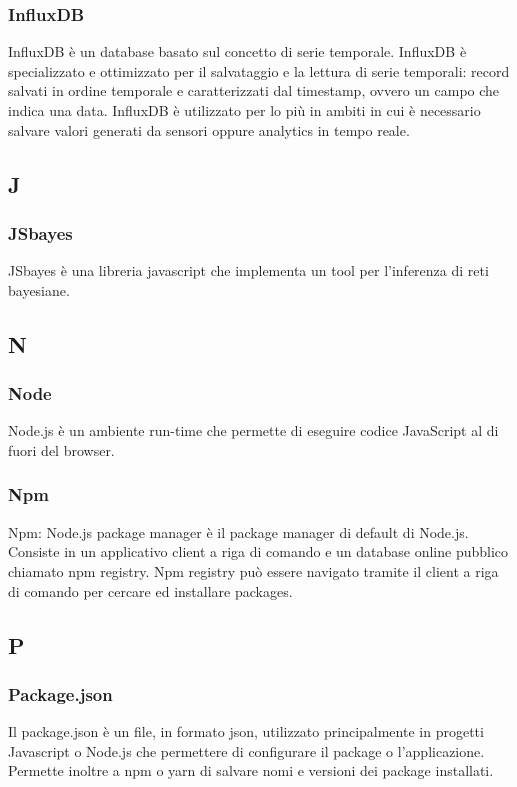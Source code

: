 	\subsubsection*{InfluxDB} 
	\label{sec:influxdb}
InfluxDB è un database basato sul concetto di serie temporale. InfluxDB è specializzato e ottimizzato per il salvataggio e la lettura di serie temporali: record salvati in ordine temporale e caratterizzati dal timestamp, ovvero un campo che indica una data. InfluxDB è utilizzato per lo più in ambiti in cui è necessario salvare valori generati da sensori oppure analytics in tempo reale.
	
\subsection*{J}

	\subsubsection*{JSbayes} 
	\label{sec:influxdb}
JSbayes è una libreria javascript che implementa un tool per l'inferenza di reti bayesiane. 


\subsection*{N}

	\subsubsection*{Node} 
	\label{sec:node}
Node.js è un ambiente run-time che permette di eseguire codice JavaScript al di fuori del browser.

	\subsubsection*{Npm} 
	\label{sec:npm}
Npm: Node.js package manager è il package manager di default di Node.js. Consiste in un applicativo client a riga di comando e un database online pubblico chiamato npm registry. Npm registry può essere navigato tramite il client a riga di comando per cercare ed installare packages.


\subsection*{P}

	\subsubsection*{Package.json} 
	\label{sec:package}
Il package.json è un file, in formato json, utilizzato principalmente in progetti Javascript o Node.js che permettere di configurare il package o l'applicazione. Permette inoltre a npm o yarn di salvare nomi e versioni dei package installati.


